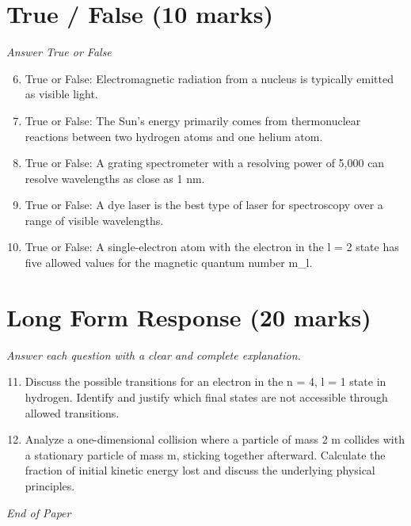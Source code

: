 \documentclass[12pt]{article}
\begin{document}
\section*{True / False (10 marks)}
\textit{Answer True or False}
\begin{enumerate}[label=\arabic*.]
\setcounter{enumi}{5}
\item True or False: Electromagnetic radiation from a nucleus is typically emitted as visible light.
\item True or False: The Sun's energy primarily comes from thermonuclear reactions between two hydrogen atoms and one helium atom.
\item True or False: A grating spectrometer with a resolving power of 5,000 can resolve wavelengths as close as 1 nm.
\item True or False: A dye laser is the best type of laser for spectroscopy over a range of visible wavelengths.
\item True or False: A single-electron atom with the electron in the l = 2 state has five allowed values for the magnetic quantum number m\_l.
\end{enumerate}

\section*{Long Form Response (20 marks)}
\textit{Answer each question with a clear and complete explanation.}
\begin{enumerate}[label=\arabic*.]
\setcounter{enumi}{10}
\item Discuss the possible transitions for an electron in the n = 4, l = 1 state in hydrogen. Identify and justify which final states are not accessible through allowed transitions.
\item Analyze a one-dimensional collision where a particle of mass 2 m collides with a stationary particle of mass m, sticking together afterward. Calculate the fraction of initial kinetic energy lost and discuss the underlying physical principles.
\end{enumerate}

\vfill
\noindent\textit{End of Paper}
\end{document}
